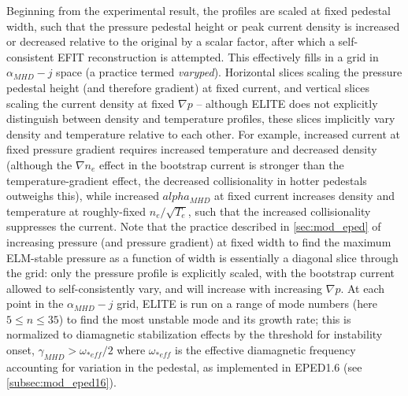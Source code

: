 Beginning from the experimental result, the profiles are scaled at fixed pedestal width, such that the pressure pedestal height or peak current density is increased or decreased relative to the original by a scalar factor, after which a self-consistent EFIT reconstruction is attempted.  This effectively fills in a grid in $\alpha_{MHD} - j$ space (a practice termed \emph{varyped}).  Horizontal slices scaling the pressure pedestal height (and therefore gradient) at fixed current, and vertical slices scaling the current density at fixed $\nabla p$ -- although ELITE does not explicitly distinguish between density and temperature profiles, these slices implicitly vary density and temperature relative to each other.  For example, increased current at fixed pressure gradient requires increased temperature and decreased density (although the $\nabla n_e$ effect in the bootstrap current is stronger than the temperature-gradient effect, the decreased collisionality in hotter pedestals outweighs this), while increased $alpha_{MHD}$ at fixed current increases density and temperature at roughly-fixed $n_e/\sqrt{T_e}$, such that the increased collisionality suppresses the current.  Note that the practice described in \cref{sec:mod_eped} of increasing pressure (and pressure gradient) at fixed width to find the maximum ELM-stable pressure as a function of width is essentially a diagonal slice through the grid: only the pressure profile is explicitly scaled, with the bootstrap current allowed to self-consistently vary, and will increase with increasing $\nabla p$.  At each point in the $\alpha_{MHD} - j$ grid, ELITE is run on a range of mode numbers (here $5 \le n \le 35$) to find the most unstable mode and its growth rate; this is normalized to diamagnetic stabilization effects by the threshold for instability onset, $\gamma_{MHD} > \omega_{*eff}/2$ where $\omega_{*eff}$ is the effective diamagnetic frequency accounting for variation in the pedestal, as implemented in EPED1.6 (see \cref{subsec:mod_eped16}).

